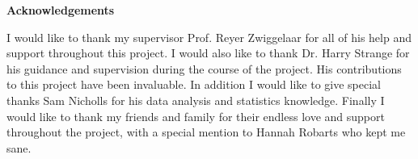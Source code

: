 \thispagestyle{empty}

\begin{center}
    {\LARGE\bf Acknowledgements}
\end{center}

I would like to thank my supervisor Prof. Reyer Zwiggelaar for all of his help and support throughout this project. I would also like to thank Dr. Harry Strange for his guidance and supervision during the course of the project. His contributions to this project have been invaluable. In addition I would like to give special thanks Sam Nicholls for his data analysis and statistics knowledge. Finally I would like to thank my friends and family for their endless love and support throughout the project, with a special mention to Hannah Robarts who kept me sane.
